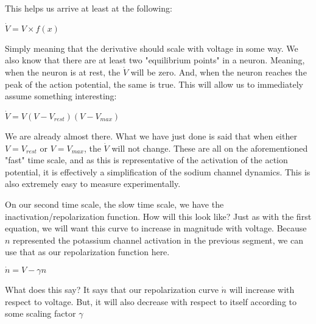 \documentclass[12pt]{amsart}
\begin{document}
This helps us arrive at least at the following: 

\bigskip

\begin{center}

    $\dot{V} = V \times f(x)$
    
\end{center}

\bigskip

Simply meaning that the derivative should scale with voltage in some way. We also know that there are at least two "equilibrium points" in a neuron. Meaning, when the neuron is at rest, the $\dot{V}$ will be zero. And, when the neuron reaches the peak of the action potential, the same is true. This will allow us to immediately assume something interesting:

\bigskip

\begin{center}

    $\dot{V} = V(V - V_{rest})(V - V_{max})$
    
\end{center}

\bigskip

We are already almost there. What we have just done is said that when either $V = V_{rest}$ or $V = V_{max}$, the $\dot{V}$ will not change. These are all on the aforementioned "fast" time scale, and as this is representative of the activation of the action potential, it is effectively a simplification of the sodium channel dynamics. This is also extremely easy to measure experimentally.\newline

On our second time scale, the slow time scale, we have the inactivation/repolarization function. How will this look like? Just as with the first equation, we will want this curve to increase in magnitude with voltage. Because $n$ represented the potassium channel activation in the previous segment, we can use that as our repolarization function here. 

\bigskip

\begin{center}

    $\dot{n} = V - \gamma n$
    
\end{center}

\bigskip

What does this say? It says that our repolarization curve $\dot{n}$ will increase with respect to voltage. But, it will also decrease with respect to itself according to some scaling factor $\gamma$\newline
\end{document}
